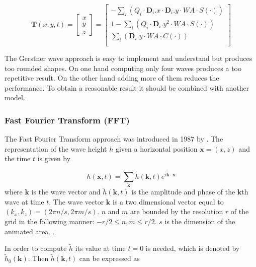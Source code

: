 \begin{equation}\label{eq:gerstner_tangent}
    \textbf{T}(x,y,t)=\begin{bmatrix}x\\ y\\ z\end{bmatrix}=\begin{bmatrix}
    - \sum_{i}(Q_i \cdot \textbf{D}_i.x \cdot \textbf{D}_i.y\cdot WA \cdot
    S(\cdot))\\
    1 - \sum_{i}(Q_i \cdot \textbf{D}_i.y^2 \cdot WA \cdot S(\cdot))\\
    \sum_{i}(\textbf{D}_i.y \cdot WA \cdot C(\cdot))\\\end{bmatrix}
\end{equation}

The Gerstner wave approach is easy to implement and understand but produces too
rounded shapes. On one hand computing only four waves produces a too repetitive
result. On the other hand adding more of them reduces the performance. To obtain
a reasonable result it should be combined with another model.

\subsubsection{Fast Fourier Transform (FFT)}\label{subsub:fft}


The Fast Fourier Transform approach was introduced in 1987 by
\citeauthor{mastin1987fourier} \autocite{mastin1987fourier}. The representation
of the wave height $h$ given a horizontal position $\textbf{x} = (x,z)$ and the
time $t$ is given by

\begin{equation}
    h(\textbf{x}, t) = \sum_{\textbf{k}}^{} \tilde{h}(\textbf{k},
    t)e^{i\textbf{k}\cdot\textbf{x}}
\end{equation}
%
where $\textbf{k}$ is the wave vector and $\tilde{h}(\textbf{k}, t)$ is the
amplitude and phase of the $\textbf{k}$th wave at time $t$. The wave vector
$\textbf{k}$ is a two dimensional vector equal to $(k_x, k_z) = (2\pi n/s, 2\pi
m / s)$. $n$ and $m$ are bounded by the resolution $r$ of the grid in the
following manner: $-r/2 \leq n,m \leq r/2$. $s$ is the dimension of the animated
area.  \autocite{jensen2001deep,darles2011survey}.

In order to compute $\tilde{h}$ its value at time $t=0$ is needed, which is
denoted by $\tilde{h}_0(\textbf{k})$.  Then $\tilde{h}(\textbf{k}, t)$ can be
expressed as

